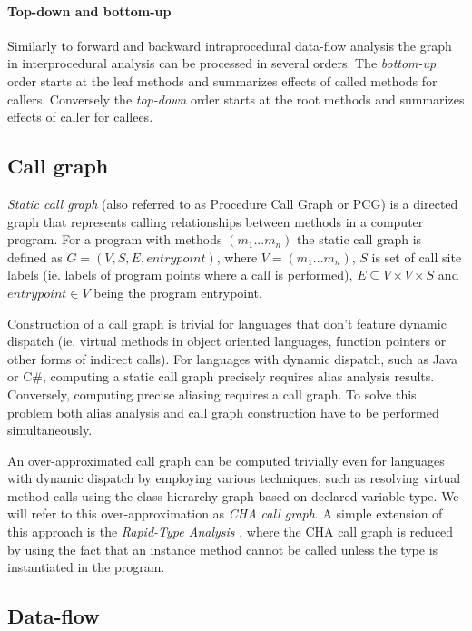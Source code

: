 \paragraph{Top-down and bottom-up} Similarly to forward and backward intraprocedural data-flow analysis the graph in interprocedural analysis can be processed in several orders. The \emph{bottom-up} order starts at the leaf methods and summarizes effects of called methods for callers. Conversely the \emph{top-down} order starts at the root methods and summarizes effects of caller for callees.

\subsection{Call graph}

\emph{Static call graph} (also referred to as Procedure Call Graph or PCG) is a directed graph that represents calling relationships between methods in a computer program. For a program with methods $(m_1...m_n)$ the static call graph is defined as $G = (V, S, E, entrypoint)$, where $V = (m_1...m_n)$, $S$ is set of call site labels (ie. labels of program points where a call is performed), $E \subseteq V \times V \times S$ and $entrypoint \in V$ being the program entrypoint.

Construction of a call graph is trivial for languages that don't feature dynamic dispatch (ie. virtual methods in object oriented languages, function pointers or other forms of indirect calls). For languages with dynamic dispatch, such as Java or C\#, computing a static call graph precisely requires alias analysis results. Conversely, computing precise aliasing requires a call graph. To solve this problem both alias analysis and call graph construction have to be performed simultaneously.

An over-approximated call graph can be computed trivially even for languages with dynamic dispatch by employing various techniques, such as resolving virtual method calls using the class hierarchy graph based on declared variable type. We will refer to this over-approximation as \emph{CHA call graph}. A simple extension of this approach is the \emph{Rapid-Type Analysis} \citep{Bacon1997}, where the CHA call graph is reduced by using the fact that an instance method cannot be called unless the type is instantiated in the program.

\subsection{Data-flow}

